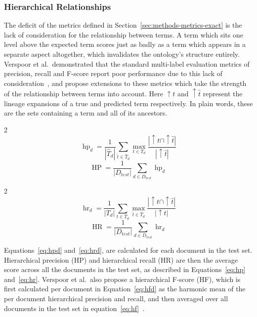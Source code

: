 \documentclass[11pt]{article}
\theoremstyle{plain}
\theoremstyle{definition}
\begin{document}
\subsubsection{Hierarchical Relationships}\label{sec:methods-metrics-hierarchical}

The deficit of the metrics defined in Section~\ref{sec:methods-metrics-exact} is the lack of consideration for the relationship between terms. A term which sits one level above the expected term scores just as badly as a term which appears in a separate aspect altogether, which invalidates the ontology's structure entirely. Verspoor et al.\ demonstrated that the standard multi-label evaluation metrics of precision, recall and F-score report poor performance due to this lack of consideration~\cite{verspoor/2006/categorization}, and propose extensions to these metrics which take the strength of the relationship between terms into account. Here ${\uparrow} t$ and ${\uparrow} \hat{t}$ represent the lineage expansions of a true and predicted term respectively. In plain words, these are the sets containing a term and all of its ancestors.

\begin{multicols}{2}
    \begin{equation}\label{eq:hpd}
        \operatorname{hp}_d = \frac{1}{|\hat{T}_d|} \sum_{\hat{t} \in \hat{T}_d} \max_{t \in T_d} \frac{|{\uparrow} t \cap  {\uparrow} \hat{t}|}{|{\uparrow} \hat{t}|}
    \end{equation}
    \break{}
    \begin{equation}\label{eq:hp}
        \operatorname{HP} = \frac{1}{|D_{test}|} \sum_{d \in D_{test}} \operatorname{hp}_d
    \end{equation}
\end{multicols}

\begin{multicols}{2}
    \begin{equation}\label{eq:hrd}
        \operatorname{hr}_d = \frac{1}{|T_d|} \sum_{t \in T_d} \max_{\hat{t} \in \hat{T}_d} \frac{|{\uparrow} t \cap  {\uparrow} \hat{t}|}{|{\uparrow} t|}
    \end{equation}
    \break{}
    \begin{equation}\label{eq:hr}
        \operatorname{HR} = \frac{1}{|D_{test}|} \sum_{d \in D_{test}} \operatorname{hr}_d
    \end{equation}
\end{multicols}

Equations~\ref{eq:hpd} and~\ref{eq:hrd}, are calculated for each document in the test set. Hierarchical precision (HP) and hierarchical recall (HR) are then the average score across all the documents in the test set, as described in Equations~\ref{eq:hp} and~\ref{eq:hr}. Verspoor et al.\ also propose a hierarchical F-score (HF), which is first calculated per document in Equation~\ref{eq:hfd}  as the harmonic mean of the per document hierarchical precision and recall, and then averaged over all documents in the test set in equation~\ref{eq:hf}~\cite{verspoor/2006/categorization}.
\end{document}

